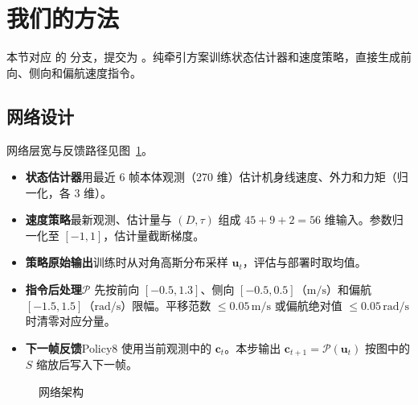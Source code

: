 \section{我们的方法}
\label{sec:pure-traction}

本节对应  的  分支，提交为 。纯牵引方案训练状态估计器和速度策略，直接生成前向、侧向和偏航速度指令。

\subsection{网络设计}
网络层宽与反馈路径见图~\ref{fig:pure-traction-network}。
\begin{itemize}
  \item \textbf{状态估计器}\enspace 用最近 6 帧本体观测（270 维）估计机身线速度、外力和力矩（归一化，各 3 维）。
  \item \textbf{速度策略}\enspace 最新观测、估计量与 $(D,\tau)$ 组成 $45+9+2=56$ 维输入。参数归一化至 $[-1,1]$，估计量截断梯度。
  \item \textbf{策略原始输出}\enspace 训练时从对角高斯分布采样 $\bm u_t$，评估与部署时取均值。
  \item \textbf{指令后处理}\enspace $\mathcal P$ 先按前向 $[-0.5,1.3]$、侧向 $[-0.5,0.5]$（$\mathrm{m/s}$）和偏航 $[-1.5,1.5]$（$\mathrm{rad/s}$）限幅。平移范数 $\le 0.05\,\mathrm{m/s}$ 或偏航绝对值 $\le 0.05\,\mathrm{rad/s}$ 时清零对应分量。
  \item \textbf{下一帧反馈}\enspace Policy8 使用当前观测中的 $\bm c_t$。本步输出 $\bm c_{t+1}=\mathcal P(\bm u_t)$ 按图中的 $S$ 缩放后写入下一帧。
\end{itemize}

\begin{figure}[!htbp]
\centering

\caption{网络架构}
\label{fig:pure-traction-network}
\end{figure}

